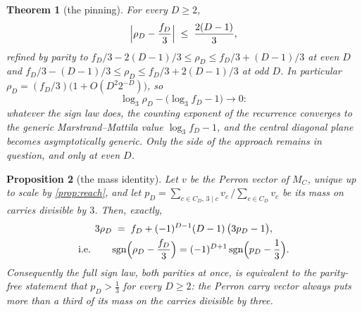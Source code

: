 \documentclass[11pt]{amsart}
\newtheorem{theorem}{Theorem}[section]
\newtheorem{proposition}[theorem]{Proposition}
\theoremstyle{definition}
\theoremstyle{remark}
\begin{document}
\begin{theorem}[the pinning]
\label{thm:pin}
For every $D \ge 2$,
\[
\Bigl\lvert \rho_D - \frac{f_D}{3} \Bigr\rvert \;\le\; \frac{2(D-1)}{3},
\]
refined by parity to $f_D/3 - 2(D-1)/3 \le \rho_D \le f_D/3 + (D-1)/3$ at even $D$ and $f_D/3 - (D-1)/3 \le \rho_D \le f_D/3 + 2(D-1)/3$ at odd $D$. In particular $\rho_D = (f_D/3)\bigl(1 + O(D^2 2^{-D})\bigr)$, so
\[
\log_3 \rho_D - \bigl( \log_3 f_D - 1 \bigr) \longrightarrow 0 :
\]
whatever the sign law does, the counting exponent of the recurrence converges to the generic Marstrand--Mattila value $\log_3 f_D - 1$, and the central diagonal plane becomes asymptotically generic. Only the \emph{side} of the approach remains in question, and only at even $D$.
\end{theorem}

\begin{proposition}[the mass identity]
\label{prop:mass}
Let $v$ be the Perron vector of $M_C$, unique up to scale by \cref{prop:reach}, and let $p_D = \sum_{c \in C_D,\, 3 \mid c} v_c \,\big/ \sum_{c \in C_D} v_c$ be its mass on carries divisible by $3$. Then, exactly,
\begin{gather*}
3\rho_D \;=\; f_D + (-1)^{D-1}(D-1)\,\bigl(3p_D - 1\bigr), \\
\text{i.e.}\qquad
\operatorname{sgn}\Bigl(\rho_D - \frac{f_D}{3}\Bigr) = (-1)^{D+1} \operatorname{sgn}\Bigl(p_D - \frac13\Bigr).
\end{gather*}
Consequently the full sign law, both parities at once, is equivalent to the parity-free statement that $p_D > \tfrac13$ for every $D \ge 2$: the Perron carry vector always puts more than a third of its mass on the carries divisible by three.
\end{proposition}
\end{document}
